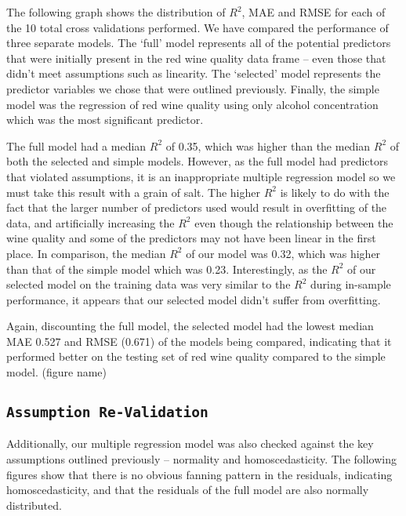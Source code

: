 \documentclass[letterpaper,8pt,twocolumn,twoside,]{pinp}
\begin{document}
The following graph shows the distribution of \(R^2\), MAE and RMSE for
each of the 10 total cross validations performed. We have compared the
performance of three separate models. The `full' model represents all of
the potential predictors that were initially present in the red wine
quality data frame -- even those that didn't meet assumptions such as
linearity. The `selected' model represents the predictor variables we
chose that were outlined previously. Finally, the simple model was the
regression of red wine quality using only alcohol concentration which
was the most significant predictor.

The full model had a median \(R^2\) of 0.35, which was higher than the
median \(R^2\) of both the selected and simple models. However, as the
full model had predictors that violated assumptions, it is an
inappropriate multiple regression model so we must take this result with
a grain of salt. The higher \(R^2\) is likely to do with the fact that
the larger number of predictors used would result in overfitting of the
data, and artificially increasing the \(R^2\) even though the
relationship between the wine quality and some of the predictors may not
have been linear in the first place. In comparison, the median \(R^2\)
of our model was 0.32, which was higher than that of the simple model
which was 0.23. Interestingly, as the \(R^2\) of our selected model on
the training data was very similar to the \(R^2\) during in-sample
performance, it appears that our selected model didn't suffer from
overfitting.

Again, discounting the full model, the selected model had the lowest
median MAE 0.527 and RMSE (0.671) of the models being compared,
indicating that it performed better on the testing set of red wine
quality compared to the simple model. (figure name)

\hypertarget{assumption-re-validation}{%
\subsection{\texorpdfstring{\texttt{Assumption\ Re-Validation}}{Assumption Re-Validation}}\label{assumption-re-validation}}

Additionally, our multiple regression model was also checked against the
key assumptions outlined previously -- normality and homoscedasticity.
The following figures show that there is no obvious fanning pattern in
the residuals, indicating homoscedasticity, and that the residuals of
the full model are also normally distributed.
\end{document}
